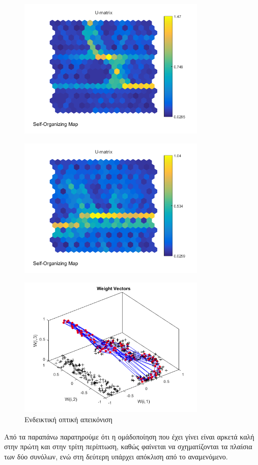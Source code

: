 \documentclass[12pt]{article}
\begin{document}
		\begin{figure}[H]
	 		\centering
			\includegraphics[width=0.8\textwidth]{fakelos/u-matrix2.png}
			\caption{} 	  
			\label{fig:2}
		\end{figure} 		 
		\begin{figure}[H]
	 		\centering
			\includegraphics[width=0.8\textwidth]{fakelos/u-matrix11.png}
			\caption{} 	  
			\label{fig:2}
		\end{figure} 		
		\begin{figure}[H]
	 		\centering
			\includegraphics[width=0.8\textwidth]{fakelos/shapeof132.png}
			\caption{Ενδεικτική οπτική απεικόνιση} 	  
			\label{fig:2}
		\end{figure} 		   	
Από τα παραπάνω παρατηρούμε ότι η ομάδοποίηση που έχει γίνει είναι αρκετά καλή στην πρώτη και στην τρίτη περίπτωση, καθώς φαίνεται να σχηματίζονται τα πλαίσια των δύο συνόλων, ενώ στη δεύτερη υπάρχει απόκλιση από το αναμενόμενο. 		
\end{document}
